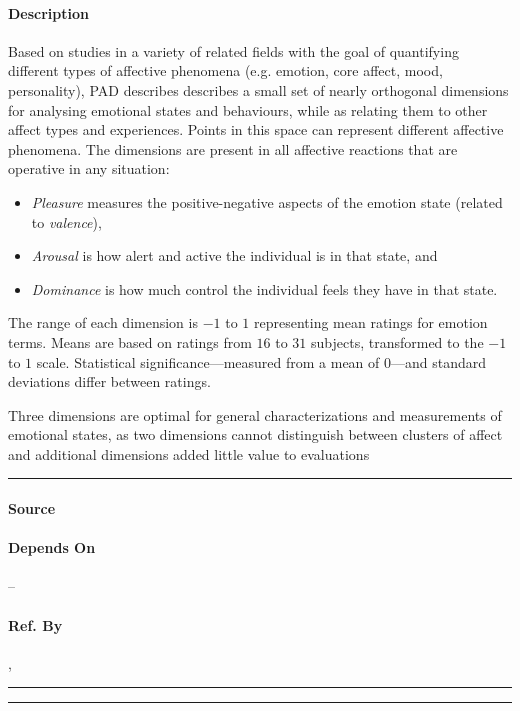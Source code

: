 \paragraph{Description} Based on studies in a variety of related fields with
the goal of quantifying different types of affective phenomena (e.g. emotion,
core affect, mood, personality), PAD describes describes a small set of nearly
orthogonal dimensions for analysing emotional states and behaviours, while as
relating them to other affect types and experiences. Points in this space can
represent different affective phenomena. The dimensions are present in all
affective reactions that are operative in any situation:
\begin{itemize}
    \item \textit{Pleasure} measures the positive-negative aspects of the
    emotion state (related to \textit{valence}),

    \item \textit{Arousal} is how alert and active the individual is in that
    state, and

    \item \textit{Dominance} is how much control the individual feels they have
    in that state.
\end{itemize}

The range of each dimension is $-1$ to $1$ representing mean ratings for
emotion terms. Means are based on ratings from $16$ to $31$ subjects,
transformed to the $-1$ to $1$ scale. Statistical significance---measured from
a mean of $0$---and standard deviations differ between ratings.

Three dimensions are optimal for general characterizations and measurements of
emotional states, as two dimensions cannot distinguish between clusters of
affect and additional dimensions added little value to evaluations\\\hrule

\paragraph{Source} \cite{mehrabian1980basic, mehrabian1996pleasure}

\paragraph{Depends On} --

\paragraph{Ref. By} , 
\\\hrule\vspace{0.5mm}\hrule

